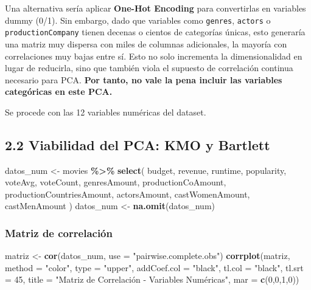 \documentclass[
]{article}
\newenvironment{Shaded}{\begin{snugshade}}{\end{snugshade}}
\newcommand{\AttributeTok}[1]{\textcolor[rgb]{0.13,0.29,0.53}{#1}}
\newcommand{\DecValTok}[1]{\textcolor[rgb]{0.00,0.00,0.81}{#1}}
\newcommand{\FunctionTok}[1]{\textcolor[rgb]{0.13,0.29,0.53}{\textbf{#1}}}
\newcommand{\NormalTok}[1]{#1}
\newcommand{\OtherTok}[1]{\textcolor[rgb]{0.56,0.35,0.01}{#1}}
\newcommand{\SpecialCharTok}[1]{\textcolor[rgb]{0.81,0.36,0.00}{\textbf{#1}}}
\newcommand{\StringTok}[1]{\textcolor[rgb]{0.31,0.60,0.02}{#1}}
\begin{document}
Una alternativa sería aplicar \textbf{One-Hot Encoding} para
convertirlas en variables dummy (0/1). Sin embargo, dado que variables
como \texttt{genres}, \texttt{actors} o \texttt{productionCompany}
tienen decenas o cientos de categorías únicas, esto generaría una matriz
muy dispersa con miles de columnas adicionales, la mayoría con
correlaciones muy bajas entre sí. Esto no solo incrementa la
dimensionalidad en lugar de reducirla, sino que también viola el
supuesto de correlación continua necesario para PCA. \textbf{Por tanto,
no vale la pena incluir las variables categóricas en este PCA.}

Se procede con las 12 variables numéricas del dataset.

\subsection{2.2 Viabilidad del PCA: KMO y
Bartlett}\label{viabilidad-del-pca-kmo-y-bartlett}

\begin{Shaded}
\begin{Highlighting}[]
\NormalTok{datos\_num }\OtherTok{\textless{}{-}}\NormalTok{ movies }\SpecialCharTok{\%\textgreater{}\%}
  \FunctionTok{select}\NormalTok{(}
\NormalTok{    budget, revenue, runtime, popularity,}
\NormalTok{    voteAvg, voteCount, genresAmount,}
\NormalTok{    productionCoAmount, productionCountriesAmount,}
\NormalTok{    actorsAmount, castWomenAmount, castMenAmount}
\NormalTok{  )}
\NormalTok{datos\_num }\OtherTok{\textless{}{-}} \FunctionTok{na.omit}\NormalTok{(datos\_num)}
\end{Highlighting}
\end{Shaded}

\subsubsection{Matriz de correlación}\label{matriz-de-correlaciuxf3n}

\begin{Shaded}
\begin{Highlighting}[]
\NormalTok{matriz }\OtherTok{\textless{}{-}} \FunctionTok{cor}\NormalTok{(datos\_num, }\AttributeTok{use =} \StringTok{"pairwise.complete.obs"}\NormalTok{)}
\FunctionTok{corrplot}\NormalTok{(matriz,}
         \AttributeTok{method  =} \StringTok{"color"}\NormalTok{,}
         \AttributeTok{type    =} \StringTok{"upper"}\NormalTok{,}
         \AttributeTok{addCoef.col =} \StringTok{"black"}\NormalTok{,}
         \AttributeTok{tl.col  =} \StringTok{"black"}\NormalTok{,}
         \AttributeTok{tl.srt  =} \DecValTok{45}\NormalTok{,}
         \AttributeTok{title   =} \StringTok{"Matriz de Correlación {-} Variables Numéricas"}\NormalTok{,}
         \AttributeTok{mar     =} \FunctionTok{c}\NormalTok{(}\DecValTok{0}\NormalTok{,}\DecValTok{0}\NormalTok{,}\DecValTok{1}\NormalTok{,}\DecValTok{0}\NormalTok{))}
\end{Highlighting}
\end{Shaded}
\end{document}
